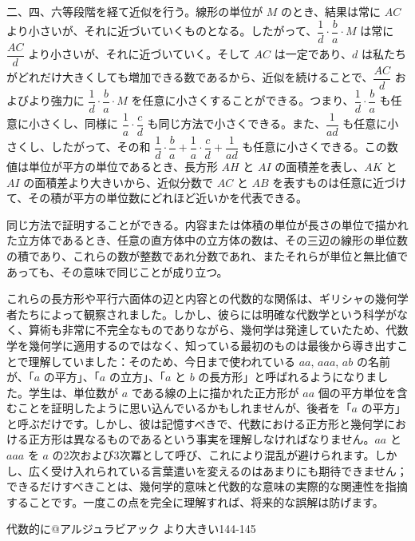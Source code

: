 \documentclass[a4paper,11pt,openany]{ltjsbook}
\begin{document}
二、四、六等段階を経て近似を行う。線形の単位が \( M \) のとき、結果は常に \( AC \) より小さいが、それに近づいていくものとなる。したがって、\(\dfrac{1}{d} \cdot \dfrac{b}{a} \cdot M\) は常に \( \dfrac{AC}{d} \) より小さいが、それに近づいていく。そして \( AC \) は一定であり、\( d \) は私たちがどれだけ大きくしても増加できる数であるから、近似を続けることで、\(\dfrac{AC}{d}\) およびより強力に \(\dfrac{1}{d} \cdot \dfrac{b}{a} \cdot M\) を任意に小さくすることができる。つまり、\(\dfrac{1}{d} \cdot \dfrac{b}{a}\) も任意に小さくし、同様に \(\dfrac{1}{a} \cdot \dfrac{c}{d}\) も同じ方法で小さくできる。また、\(\dfrac{1}{ad}\) も任意に小さくし、したがって、その和 \(\dfrac{1}{d} \cdot \dfrac{b}{a} + \dfrac{1}{a} \cdot \dfrac{c}{d} + \dfrac{1}{ad}\) も任意に小さくできる。この数値は単位が平方の単位であるとき、長方形 \( AH \) と \( AI \) の面積差を表し、\( AK \) と \( AI \) の面積差より大きいから、近似分数で \( AC \) と \( AB \) を表すものは任意に近づけて、その積が平方の単位数にどれほど近いかを代表できる。

同じ方法で証明することができる。内容または体積の単位が長さの単位で描かれた立方体であるとき、任意の直方体中の立方体の数は、その三辺の線形の単位数の積であり、これらの数が整数であれ分数であれ、またそれらが単位と無比値であっても、その意味で同じことが成り立つ。

これらの長方形や平行六面体の辺と内容との代数的な関係は、ギリシャの幾何学者たちによって観察されました。しかし、彼らには明確な代数学という科学がなく、算術も非常に不完全なものでありながら、幾何学は発達していたため、代数学を幾何学に適用するのではなく、知っている最初のものは最後から導き出すことで理解していました：そのため、今日まで使われている $aa$, $aaa$, $ab$ の名前が、「$a$ の平方」、「$a$ の立方」、「$a$ と $b$ の長方形」と呼ばれるようになりました。学生は、単位数が $a$ である線の上に描かれた正方形が $aa$ 個の平方単位を含むことを証明したように思い込んでいるかもしれませんが、後者を「$a$ の平方」と呼ぶだけです。しかし、彼は記憶すべきで、代数における正方形と幾何学における正方形は異なるものであるという事実を理解しなければなりません。$aa$ と $aaa$ を $a$ の2次および3次冪として呼び、これにより混乱が避けられます。しかし、広く受け入れられている言葉遣いを変えるのはあまりにも期待できません；できるだけすべきことは、幾何学的意味と代数的な意味の実際的な関連性を指摘することです。一度この点を完全に理解すれば、将来的な誤解は防げます。

代数的に@アルジュラビアック より大きい144-145
\end{document}
